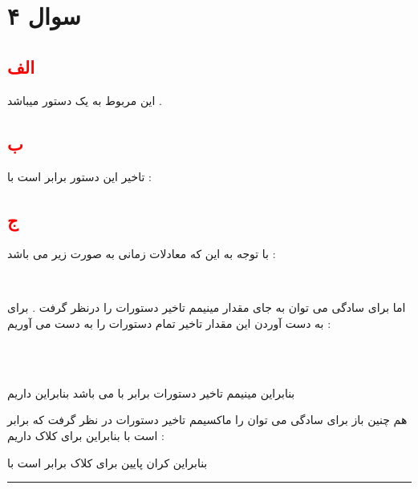 \documentclass{article}
\begin{document}
\section*{سوال ۴  }
\subsection*{\textcolor{red}{الف}}
این 
مربوط به یک دستور 
میباشد  . 
\subsection*{\textcolor{red}{ب}}
تاخیر این دستور برابر است با  : 
\begin{center}

\end{center}
\subsection*{\textcolor{red}{ج}}
با توجه به این که معادلات زمانی به صورت زیر می باشد  : 
\begin{center}
	\\
\end{center}
اما برای سادگی می توان به جای 
مقدار مینیمم تاخیر دستورات را درنظر گرفت . برای به دست آوردن این مقدار تاخیر تمام دستورات را به دست می آوریم  : 
\begin{center}
	\\
	\\
\end{center}
بنابراین مینیمم تاخیر دستورات برابر با 
\lr{\textcolor{red}{5ns}}
می باشد بنابراین داریم 
\begin{center}
\end{center}
هم چنین باز برای سادگی می توان 
را ماکسیمم تاخیر دستورات در نظر گرفت  که برابر است با 
\lr{\textcolor{red}{8ns}}
بنابراین برای کلاک داریم  : 
\begin{center}
	
\end{center}
بنابراین کران پایین برای کلاک برابر است با 
\lr{\textcolor{red}{8.3ns}}
\hrule
\end{document}
